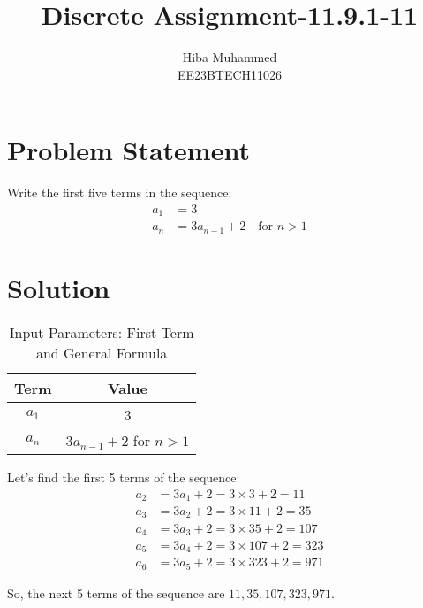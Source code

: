 \documentclass[12pt]{article}
\begin{document}
\title{Discrete Assignment-11.9.1-11}
\author{Hiba Muhammed \\
        EE23BTECH11026}
\maketitle

\section*{Problem Statement}
Write the first five terms in the sequence:
\[
\begin{aligned}
a_1 &= 3 \\
a_n &= 3a_{n-1} + 2 \quad \text{for } n > 1
\end{aligned}
\]

\section*{Solution}
\begin{table}[h]
  \centering
  \caption{Input Parameters: First Term and General Formula}
  \begin{tabular}{|c|c|}
    \hline
    \textbf{Term} & \textbf{Value} \\
    \hline
    \(a_1\) & 3 \\
    \(a_n\) & \(3a_{n-1} + 2\) for \(n > 1\) \\
    \hline
  \end{tabular}
\end{table}
Let's find the first 5 terms of the sequence:
\begin{align}
a_2 &= 3a_1 + 2 = 3 \times 3 + 2 = 11 \\a_3 &= 3a_2 + 2 = 3 \times 11 + 2 = 35 \\
a_4 &= 3a_3 + 2 = 3 \times 35 + 2 = 107 \\a_5 &= 3a_4 + 2 = 3 \times 107 + 2 = 323 \\
a_6 &= 3a_5 + 2 = 3 \times 323 + 2 = 971 
\end{align}

So, the next 5 terms of the sequence are \(11, 35, 107, 323, 971\).
\end{document}
